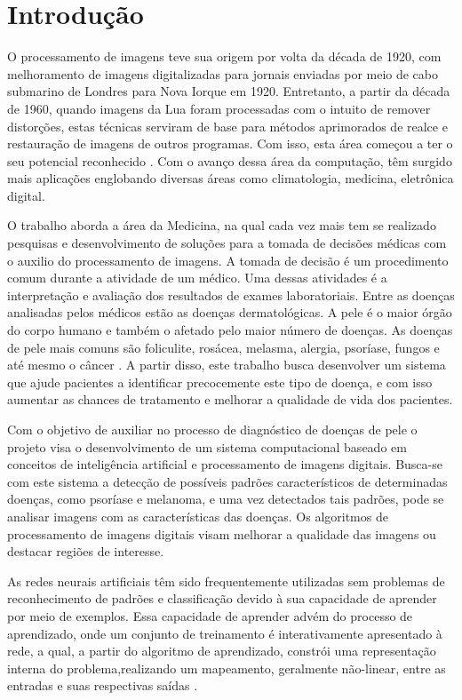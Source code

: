 \documentclass[openright]{ifrs} %
\begin{document}
\tableofcontents

\chapter{Introdução}
O processamento de imagens teve sua origem por volta da década de 1920, com melhoramento de imagens digitalizadas para jornais enviadas por meio de cabo submarino de Londres para Nova Iorque em 1920. Entretanto, a partir da década de 1960, quando imagens da Lua foram processadas com o intuito de remover distorções, estas técnicas serviram de base para métodos aprimorados de realce e restauração de imagens de outros programas. Com isso, esta área começou a ter o seu potencial reconhecido \cite{Gozalez}. Com o avanço dessa área da computação, têm surgido mais aplicações englobando diversas áreas como climatologia, medicina, eletrônica digital.

O trabalho aborda a área da Medicina, na qual cada vez mais tem se realizado pesquisas e desenvolvimento de soluções para a tomada de decisões médicas com o auxilio do processamento de imagens. A tomada de decisão é um procedimento comum durante a atividade de um médico. Uma dessas atividades é a interpretação e avaliação dos resultados de exames laboratoriais. Entre as doenças analisadas pelos médicos estão as doenças dermatológicas. A pele é o maior órgão do corpo humano e também o afetado pelo maior número de doenças. As doenças de pele mais comuns são foliculite, rosácea, melasma, alergia, psoríase, fungos e até mesmo o câncer \cite{SBC}. A partir disso, este trabalho busca desenvolver um sistema que ajude pacientes a identificar precocemente este tipo de doença, e com isso aumentar as chances de tratamento e melhorar a qualidade de vida dos pacientes.

Com o objetivo de auxiliar no processo de diagnóstico de doenças de pele o projeto visa o desenvolvimento de um sistema computacional baseado em conceitos de inteligência artificial e processamento de imagens digitais. Busca-se com este sistema a detecção de possíveis padrões característicos de determinadas doenças, como psoríase e melanoma, e uma vez detectados tais padrões, pode se  analisar imagens com as características das doenças. Os algoritmos de processamento de imagens digitais visam melhorar a qualidade das imagens ou destacar regiões de interesse.

As redes neurais artificiais têm sido frequentemente utilizadas sem problemas de reconhecimento de padrões e classificação devido à sua capacidade de aprender por meio de exemplos. Essa capacidade de aprender advém do processo de aprendizado, onde um conjunto de treinamento é interativamente apresentado à rede, a qual, a partir do algoritmo de aprendizado, constrói uma representação interna do problema,realizando um mapeamento, geralmente não-linear, entre as entradas e suas respectivas saídas \cite{haykin2001redes}.
\end{document}
